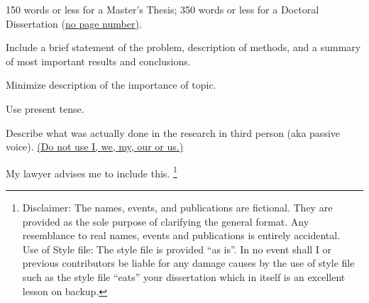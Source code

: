 150 words or less for a Master's Thesis; 350 words or less for a Doctoral Dissertation (\underline{no page number)}.
%

Include a brief statement of the problem, description of methods, and a summary of most important results and conclusions.
%

Minimize description of the importance of topic.
%

Use present tense.
%

Describe what was actually done in the research in third person (aka passive voice). \underline{(Do not use I, we, my, our or us.)}



My lawyer advises me to include this. \footnote{
{\sc Disclaimer}:  The names, events,
and publications are fictional.  They are provided as the sole purpose of
clarifying the general format.  Any resemblance to real names, events and
publications is entirely accidental. \\
{\sc Use of Style file}: The style file is provided ``as is''. In no event shall I or previous contributors be liable for any damage causes by the use of style file such as the style file ``eats'' your dissertation which in itself is an excellent lesson on backup.}
